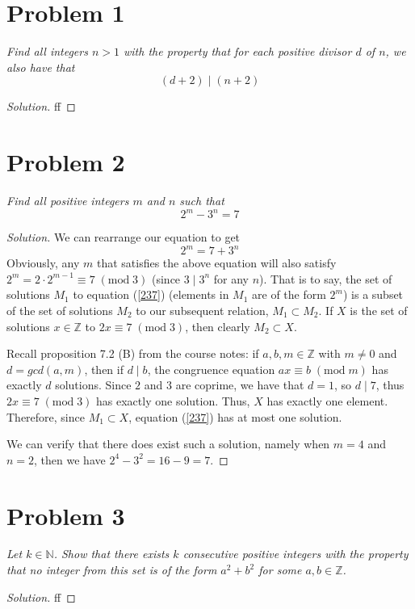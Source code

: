\documentclass{article}
\newcommand{\N}{{\mathbb N}}
\newcommand{\Z}{{\mathbb Z}}
\begin{document}
\section{Problem 1}
{\it Find all integers $n>1$ with the property that for each positive
divisor $d$ of $n$, we also have that
\[
	(d+2)\mid(n+2)
\]
}
\begin{proof}[Solution]
	ff
\end{proof}
\clearpage

\section{Problem 2}
{\it Find all positive integers $m$ and $n$ such that
\[
	2^m - 3^n = 7
\]
}
\begin{proof}[Solution]
	We can rearrange our equation to get
	\begin{equation}\label{237}
		2^m = 7 + 3^n
	\end{equation}
	Obviously, any $m$ that satisfies the above equation
	will also satisfy $2^m = 2\cdot2^{m-1} \equiv 7 \; (\mathrm{mod} \; 3)$
	(since $3 \mid 3^n$ for any $n$).
	That is to say, the set of solutions $M_1$ to equation (\ref{237})
	(elements in $M_1$ are of the form $2^m$)
	is a subset of the set of solutions $M_2$ to our subsequent relation,
	$M_1 \subset M_2$.
	If $X$ is the set of solutions $x\in\Z$ to $2x \equiv 7 \; (\mathrm{mod} \; 3)$,
	then clearly $M_2 \subset X$.

	Recall proposition 7.2 (B) from the course notes: if $a,b,m \in \Z$ with $m\neq0$
	and $d = gcd(a,m)$,
	then if $d \mid b$, the congruence equation $ax \equiv b \; (\mathrm{mod} \; m)$
	has exactly $d$ solutions.
	Since $2$ and $3$ are coprime, we have that $d = 1$,
	so $d \mid 7$,
	thus $2x \equiv 7 \; (\mathrm{mod} \; 3)$
	has exactly one solution.
	Thus, $X$ has exactly one element.
	Therefore, since $M_1 \subset X$,
	equation (\ref{237}) has at most one solution.

	We can verify that there does exist such a solution,
	namely when $m = 4$ and $n = 2$,
	then we have $2^4 - 3^2 = 16 - 9 = 7$.
\end{proof}
\clearpage

\section{Problem 3}
{\it Let $k \in \N$. Show that there exists $k$ consecutive positive integers
with the property that no integer from this set is of the form
$a^2 + b^2$ for some $a,b \in \Z$.}
\begin{proof}[Solution]
	ff
\end{proof}
\clearpage
\end{document}

